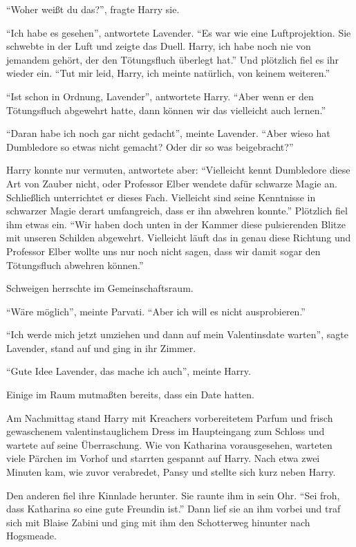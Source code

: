 \enquote{Woher weißt du das?}, fragte Harry sie.

\enquote{Ich habe es gesehen}, antwortete Lavender. \enquote{Es war wie eine Luftprojektion. Sie schwebte in der Luft und zeigte das Duell. Harry, ich habe noch nie von jemandem gehört, der den Tötungsfluch überlegt hat.} Und plötzlich fiel es ihr wieder ein. \enquote{Tut mir leid, Harry, ich meinte natürlich, von keinem weiteren.}

\enquote{Ist schon in Ordnung, Lavender}, antwortete Harry. \enquote{Aber wenn er den Tötungsfluch abgewehrt hatte, dann können wir das vielleicht auch lernen.}

\enquote{Daran habe ich noch gar nicht gedacht}, meinte Lavender. \enquote{Aber wieso hat Dumbledore so etwas nicht gemacht? Oder dir so was beigebracht?}

Harry konnte nur vermuten, antwortete aber: \enquote{Vielleicht kennt Dumbledore diese Art von Zauber nicht, oder Professor Elber wendete dafür schwarze Magie an. Schließlich unterrichtet er dieses Fach. Vielleicht sind seine Kenntnisse in schwarzer Magie derart umfangreich, dass er ihn abwehren konnte.} Plötzlich fiel ihm etwas ein. \enquote{Wir haben doch unten in der Kammer diese pulsierenden Blitze mit unseren Schilden abgewehrt. Vielleicht läuft das in genau diese Richtung und Professor Elber wollte uns nur noch nicht sagen, dass wir damit sogar den Tötungsfluch abwehren können.}

Schweigen herrschte im Gemeinschaftsraum.

\enquote{Wäre möglich}, meinte Parvati. \enquote{Aber ich will es nicht ausprobieren.}

\enquote{Ich werde mich jetzt umziehen und dann auf mein Valentinsdate warten}, sagte Lavender, stand auf und ging in ihr Zimmer.

\enquote{Gute Idee Lavender, das mache ich auch}, meinte Harry.

Einige im Raum mutmaßten bereits, dass  ein Date hatten.

Am Nachmittag stand Harry mit Kreachers vorbereitetem Parfum und frisch gewaschenem valentinstauglichem Dress im Haupteingang zum Schloss und wartete auf seine Überraschung. Wie von Katharina vorausgesehen, warteten viele Pärchen im Vorhof und starrten gespannt auf Harry. Nach etwa zwei Minuten kam, wie zuvor verabredet, Pansy und stellte sich kurz neben Harry.

Den anderen fiel ihre Kinnlade herunter. Sie raunte ihm in sein Ohr. \enquote{Sei froh, dass Katharina so eine gute Freundin ist.} Dann lief sie an ihm vorbei und traf sich mit Blaise Zabini und ging mit ihm den Schotterweg hinunter nach Hogsmeade.

